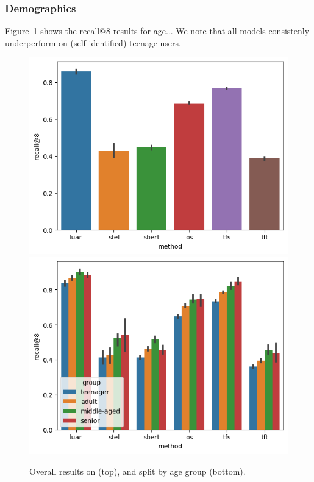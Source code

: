 \subsubsection{Demographics}
Figure~\ref{fig:demographic_fixed:age} shows the recall@8 results for age... 
We note that all models consistenly underperform on (self-identified) teenage users.

\begin{figure}[h]
    \centering
    \includegraphics[width=0.48\linewidth]{stylometryExtensions/figures/demo/fixeddelta_demographics_age.png}
    \includegraphics[width=0.48\linewidth]{stylometryExtensions/figures/demo/fixeddelta_demographics_age_groupwise.png}
    \caption{Overall results on \DSagefixed{} (top), and split by age group (bottom). }
    \label{fig:demographic_fixed:age}
\end{figure}

